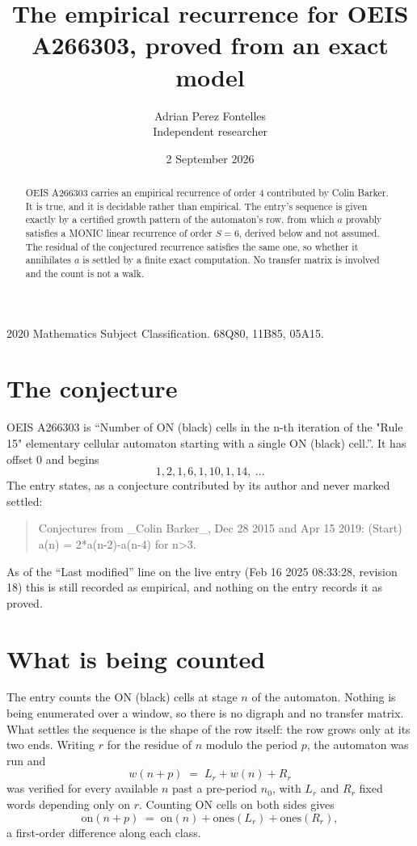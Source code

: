 \documentclass[11pt,a4paper]{article}
\title{The empirical recurrence for OEIS A266303, proved from an exact model}
\author{Adrian Perez Fontelles\\ \small Independent researcher}
\date{2 September 2026}
\theoremstyle{plain}
\theoremstyle{definition}
\begin{document}
\maketitle

\begin{abstract}
OEIS A266303 carries an empirical recurrence of order $4$ contributed by Colin Barker. It is true, and it is
decidable rather than empirical. The entry's sequence is given exactly by a certified growth pattern of the automaton's row, from
which $a$ provably satisfies a MONIC linear recurrence of order $S=6$, derived below and not
assumed. The residual of the conjectured recurrence satisfies the same one, so whether it
annihilates $a$ is settled by a finite exact computation. No transfer matrix is involved and
the count is not a walk.
\end{abstract}

\noindent\small 2020 Mathematics Subject Classification. 68Q80, 11B85, 05A15.\normalsize

\section{The conjecture}

OEIS A266303 is ``Number of ON (black) cells in the n-th iteration of the "Rule 15" elementary cellular automaton starting with a single ON (black) cell.''. It has offset $0$ and begins
\[
1, 2, 1, 6, 1, 10, 1, 14,\ \dots
\]
The entry states, as a conjecture contributed by its author and never marked settled:
\begin{quote}
Conjectures from \_Colin Barker\_, Dec 28 2015 and Apr 15 2019: (Start) a(n) = 2*a(n-2)-a(n-4) for n>3.
\end{quote}
As of the ``Last modified'' line on the live entry (Feb 16 2025 08:33:28, revision 18)
this is still recorded as empirical, and nothing on the entry records it as proved.

\section{What is being counted}

The entry counts the ON (black) cells at stage $n$ of the automaton. Nothing is being enumerated over a window, so there is
no digraph and no transfer matrix. What settles the sequence is the shape of the row itself:
the row grows only at its two ends. Writing
$r$ for the residue of $n$ modulo the period $p$, the automaton was run and
\[
w(n+p)\;=\;L_r + w(n) + R_r
\]
was verified for every available $n$ past a
pre-period $n_0$, with $L_r$ and $R_r$ fixed words depending only on $r$. Counting ON cells on
both sides gives
\[
\mathrm{on}(n+p)\;=\;\mathrm{on}(n)+\mathrm{ones}(L_r)+\mathrm{ones}(R_r),
\]
a first-order difference along each class.
\end{document}
